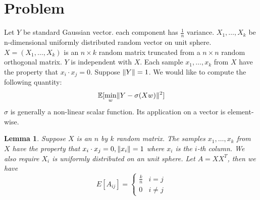 \documentclass{article}
\DeclarePairedDelimiter\norm{\lVert}{\rVert}
\def\E{\mathbb{E}}
\newtheorem{lemma}{Lemma}
\begin{document}
\section{Problem}
Let $Y$ be standard Gaussian vector. each component has $ \frac{1}{n}$ variance.
$X_1, \dots, X_k$ be
n-dimensional uniformly distributed random vector on unit sphere.
$X=(X_1, \dots, X_k)$ is an $n\times k$ random matrix
truncated from a $n\times n$ random orthogonal matrix.
$Y$ is independent with $X$.
Each sample $x_1, \dots, x_k$ from $X$ have the property that
$x_i \cdot x_j = 0$. Suppose $\norm{Y}=1$.
We would like to compute the following quantity:
\begin{equation}\label{eq:Eminw}
\E[\min_w \norm{Y - \sigma (X w ) }^2]
\end{equation}
$\sigma$ is generally a non-linear scalar function.
Its application on a vector is element-wise.
\begin{lemma}\label{lem:uniform}
Suppose $X$ is an $n$ by $k$ random matrix.
The samples $x_1, \dots, x_k$ from $X$ have the property that
$x_i \cdot x_j = 0, \norm{x_i}=1$ where $x_i$ is the $i$-th column.
We also require $X_i$ is uniformly distributed on an unit sphere.
Let $A=X X^T$, then we have
\begin{equation}
E[A_{ij}]= \begin{cases}
\frac{k}{n} & i = j\\
0 & i\neq j
\end{cases}
\end{equation}
\end{lemma}
\end{document}

